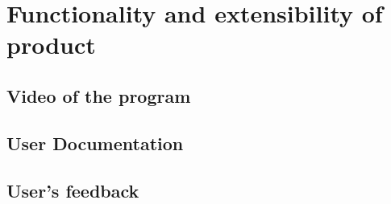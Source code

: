 \chapter{Functionality and extensibility of product}

\section{Video of the program}
\section{User Documentation}
\section{User's feedback}